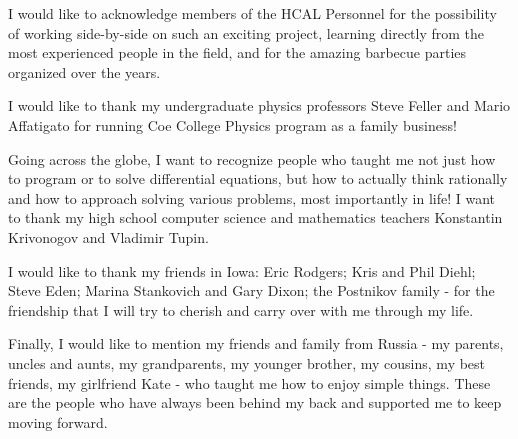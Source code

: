 I would like to acknowledge members of the HCAL Personnel for the possibility of working side-by-side on such an exciting project, learning directly from the most experienced people in the field, and for the amazing barbecue parties organized over the years.

I would like to thank my undergraduate physics professors Steve Feller and Mario Affatigato for running Coe College Physics program as a family business!

Going across the globe, I want to recognize people who taught me not just how to program or to solve differential equations, but how to actually think rationally and how to approach solving various problems, most importantly in life! I want to thank my high school computer science and mathematics teachers Konstantin Krivonogov and Vladimir Tupin.

I would like to thank my friends in Iowa: Eric Rodgers; Kris and Phil Diehl; Steve Eden; Marina Stankovich and Gary Dixon; the Postnikov family - for the friendship that I will try to cherish and carry over with me through my life.

Finally, I would like to mention my friends and family from Russia - my parents, uncles and aunts, my grandparents, my younger brother, my cousins, my best friends, my girlfriend Kate - who taught me how to enjoy simple things. These are the people who have always been behind my back and supported me to keep moving forward.